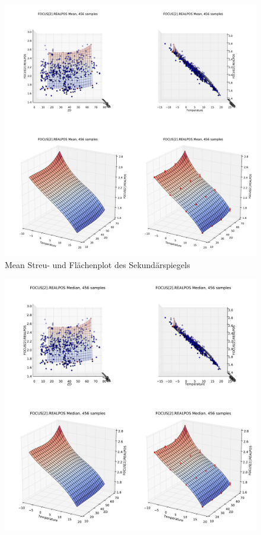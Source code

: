 \begin{appendix}
\begin{figure}[H]
	\centering
	\includegraphics[scale=.44]{tsi_surf/POSITION_INSTRUMENTAL_FOCUS_2__REALPOS_mean.pdf}
	\caption[Mean Streu- und Flächenplot des Sekundärspiegels]{Mean Streu- und Flächenplot des Sekundärspiegels}
    \label{foc_mean}
\end{figure}
\begin{figure}[H]
	\centering
	\includegraphics[scale=.44]{tsi_surf/POSITION_INSTRUMENTAL_FOCUS_2__REALPOS_med.pdf}

\end{figure}
\end{appendix}
